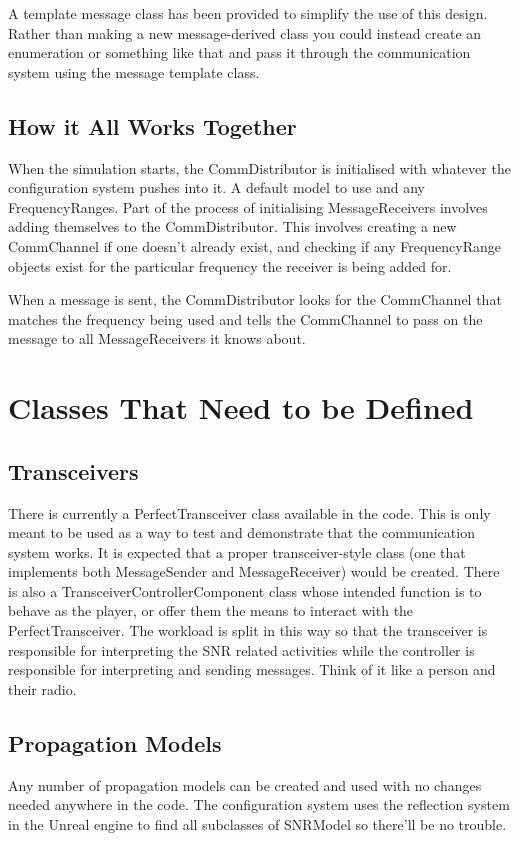 \documentclass[../main.tex]{subfiles}
\begin{document}
A template message class has been provided to simplify the use of this design.
Rather than making a new message-derived class you could instead create an enumeration or something like that and pass it through the communication system using the message template class.

\subsection{How it All Works Together}
When the simulation starts, the CommDistributor is initialised with whatever the configuration system pushes into it.
A default model to use and any FrequencyRanges.
Part of the process of initialising MessageReceivers involves adding themselves to the CommDistributor.
This involves creating a new CommChannel if one doesn't already exist, and checking if any FrequencyRange objects exist for the particular frequency the receiver is being added for.

When a message is sent, the CommDistributor looks for the CommChannel that matches the frequency being used and tells the CommChannel to pass on the message to all MessageReceivers it knows about.

\section[Required Classes]{Classes That Need to be Defined}
\subsection{Transceivers}
There is currently a PerfectTransceiver class available in the code.
This is only meant to be used as a way to test and demonstrate that the communication system works.
It is expected that a proper transceiver-style class (one that implements both MessageSender and MessageReceiver) would be created.
There is also a TransceiverControllerComponent class whose intended function is to behave as the player, or offer them the means to interact with the PerfectTransceiver.
The workload is split in this way so that the transceiver is responsible for interpreting the SNR related activities while the controller is responsible for interpreting and sending messages.
Think of it like a person and their radio.

\subsection{Propagation Models}
Any number of propagation models can be created and used with no changes needed anywhere in the code.
The configuration system uses the reflection system in the Unreal engine to find all subclasses of SNRModel so there'll be no trouble.
\end{document}
